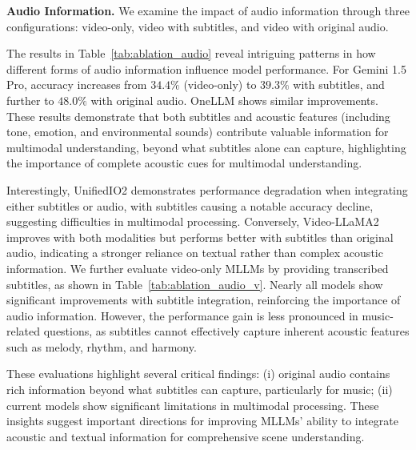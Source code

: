 \textbf{Audio Information.}
We examine the impact of audio information through three configurations: video-only, video with subtitles, and video with original audio. 

The results in Table~\ref{tab:ablation_audio} reveal intriguing patterns in how different forms of audio information influence model performance. For Gemini 1.5 Pro, accuracy increases from $34.4\%$ (video-only) to $39.3\%$ with subtitles, and further to $48.0\%$ with original audio. OneLLM shows similar improvements. These results demonstrate that both subtitles and acoustic features (including tone, emotion, and environmental sounds) contribute valuable information for multimodal understanding, beyond what subtitles alone can capture, highlighting the importance of complete acoustic cues for multimodal understanding.

Interestingly, UnifiedIO2 demonstrates performance degradation when integrating either subtitles or audio, with subtitles causing a notable accuracy decline, suggesting difficulties in multimodal processing. Conversely, Video-LLaMA2 improves with both modalities but performs better with subtitles than original audio, indicating a stronger reliance on textual rather than complex acoustic information.
We further evaluate video-only MLLMs by providing transcribed subtitles, as shown in Table~\ref{tab:ablation_audio_v}. Nearly all models show significant improvements with subtitle integration, reinforcing the importance of audio information. However, the performance gain is less pronounced in music-related questions, as subtitles cannot effectively capture inherent acoustic features such as melody, rhythm, and harmony.

These evaluations highlight several critical findings: (i) original audio contains rich information beyond what subtitles can capture, particularly for music; (ii) current models show significant limitations in multimodal processing. 
These insights suggest important directions for improving MLLMs' ability to integrate acoustic and textual information for comprehensive scene understanding.



